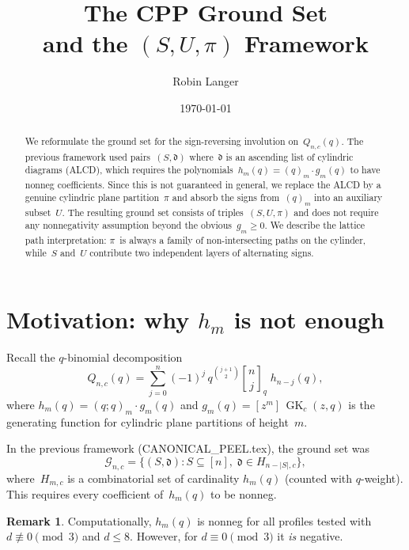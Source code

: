 \documentclass[11pt]{article}
\title{The CPP Ground Set \\
  and the $(S, U, \pi)$ Framework}
\author{Robin Langer}
\date{\today}
\newcommand{\GK}{\operatorname{GK}}
\newcommand{\qpochn}[3]{(#1;#2)_{#3}}
\newcommand{\qbin}[2]{\genfrac{[}{]}{0pt}{}{#1}{#2}}
\theoremstyle{plain}
\theoremstyle{definition}
\newtheorem{remark}[theorem]{Remark}
\begin{document}
\maketitle

\begin{abstract}
We reformulate the ground set for the sign-reversing
involution on~$Q_{n,c}(q)$.  The previous framework
used pairs~$(S, \mathfrak{d})$ where~$\mathfrak{d}$ is
an ascending list of cylindric diagrams (ALCD), which
requires the polynomials~$h_m(q) = (q)_m \cdot g_m(q)$
to have nonneg coefficients.  Since this is not guaranteed
in general, we replace the ALCD by a genuine cylindric
plane partition~$\pi$ and absorb the signs from~$(q)_m$
into an auxiliary subset~$U$.  The resulting ground set
consists of triples~$(S, U, \pi)$ and does not require
any nonnegativity assumption beyond the obvious~$g_m \geq 0$.
We describe the lattice path interpretation: $\pi$~is
always a family of non-intersecting paths on the cylinder,
while~$S$ and~$U$ contribute two independent layers of
alternating signs.
\end{abstract}

\tableofcontents


\section{Motivation: why \texorpdfstring{$h_m$}{h\_m} is not enough}

Recall the $q$-binomial decomposition
\begin{equation}\label{eq:qbin-decomp}
  Q_{n,c}(q)
  = \sum_{j=0}^{n} (-1)^j \, q^{\binom{j+1}{2}}
    \qbin{n}{j}_{\!q} \; h_{n-j}(q),
\end{equation}
where $h_m(q) = \qpochn{q}{q}{m} \cdot g_m(q)$ and
$g_m(q) = [z^m]\,\GK_c(z,q)$ is the generating function
for cylindric plane partitions of height~$m$.

In the previous framework (CANONICAL\_PEEL.tex), the ground
set was
\[
  \mathcal{G}_{n,c}
  = \bigl\{(S, \mathfrak{d})
    : S \subseteq [n],\;
      \mathfrak{d} \in H_{n-|S|, c}\bigr\},
\]
where~$H_{m,c}$ is a combinatorial set of cardinality
$h_m(q)$ (counted with $q$-weight).  This requires every
coefficient of~$h_m(q)$ to be nonneg.

\begin{remark}
Computationally, $h_m(q)$ is nonneg for all profiles
tested with $d \not\equiv 0 \pmod{3}$ and $d \leq 8$.
However, for $d \equiv 0 \pmod{3}$ it \emph{is} negative.
\end{remark}
\end{document}
